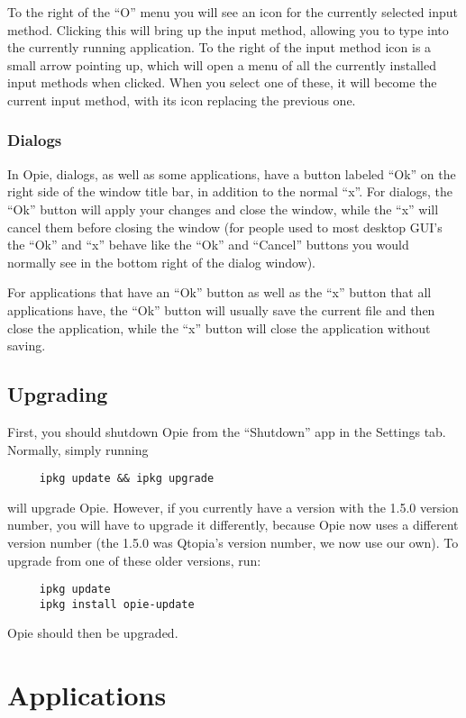 \documentclass[12pt,letterpaper,oneside, openany]{book} \usepackage[latin1] {inputenc}
\begin{document}
To the right of the ``O'' menu you will see an icon for the currently selected input method.  Clicking this will bring up the input method, allowing you to type into the currently running application.  To the right of the input method icon is a small arrow pointing up, which will open a menu of all the currently installed input methods when clicked.  When you select one of these, it will become the current input method, with its icon replacing the previous one.

\section{Dialogs}

In Opie, dialogs, as well as some applications, have a button labeled ``Ok'' on the right side of the window title bar, in addition to the normal ``x''.  For dialogs, the ``Ok'' button will apply your changes and close the window, while the ``x'' will cancel them before closing the window (for people used to most desktop GUI's the ``Ok'' and ``x'' behave like the ``Ok'' and ``Cancel'' buttons you would normally see in the bottom right of the dialog window).

For applications that have an ``Ok'' button as well as the ``x'' button that all applications have, the ``Ok'' button will usually save the current file and then close the application, while the ``x'' button will close the application without saving.

\chapter{Upgrading} 

First, you should shutdown Opie from the ``Shutdown'' app in the Settings tab. Normally, simply running 
\begin{verbatim}
     ipkg update && ipkg upgrade
\end{verbatim}
will upgrade Opie. However, if you currently have a version with the 1.5.0 version number, you will have to upgrade it differently, because Opie now uses a different version number (the 1.5.0 was Qtopia's version number, we now use our own). To upgrade from one of these older versions, run: 
\begin{verbatim}
     ipkg update
     ipkg install opie-update
\end{verbatim}
Opie should then be upgraded.

\part{Applications}
\end{document}
